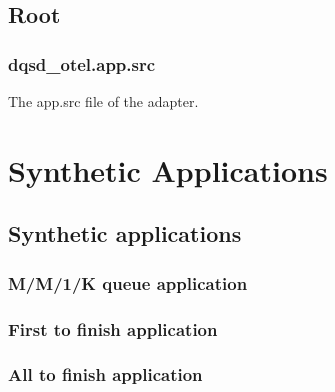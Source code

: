 \section{Root}

\subsection{dqsd\_otel.app.src}
The app.src file of the adapter.


\chapter{Synthetic Applications}

\section{Synthetic applications} \label{app:synte}
\subsection{M/M/1/K queue application} \label{app:mm1k}



\subsection{First to finish application} \label{app:ftf}



\subsection{All to finish application} \label{app:atf}





